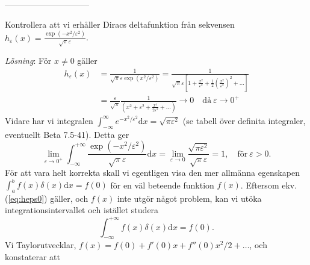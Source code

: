 \documentclass[%
oneside,                 %
final,                   %
10pt]{article}
\newenvironment{notice_mdfboxadmon}[1][]{
\begin{notice_mdfboxmdframed}[frametitle=#1]
}
{
\end{notice_mdfboxmdframed}
}
\begin{document}
------------------------------


\begin{notice_mdfboxadmon}

Kontrollera att vi erhåller Diracs deltafunktion från sekvensen $h_\varepsilon(x) = \frac{\exp(-x^2 / \varepsilon^2)}{\sqrt{\pi} \varepsilon}$.

\emph{Lösning}:
För $x \neq 0$ gäller
\begin{align}
h_\varepsilon(x) 
&= \frac{1}{\sqrt{\pi} \varepsilon \exp(x^2 / \varepsilon^2)}
= \frac{1}{\sqrt{\pi} \varepsilon \left[ 1 + \frac{x^2}{\varepsilon^2} + \frac{1}{2}\left(\frac{x^2}{\varepsilon^2}\right)^2 + \ldots \right] } \nonumber \\ 
&= \frac{\varepsilon}{\sqrt{\pi}} \frac{1}{\left( x^2 + \varepsilon^2 + \frac{x^4}{2\varepsilon^2} + \ldots \right)} \to 0 \quad \mathrm{då~} \varepsilon \to 0^+
\label{eq:heps0}
\end{align}
Vidare har vi integralen $\int_{-\infty}^\infty e^{-x^2 / \varepsilon^2} \mbox{d}x = \sqrt{\pi \varepsilon^2}$ (se tabell över definita integraler, eventuellt Beta 7.5-41). Detta ger
\begin{equation}
\lim_{\varepsilon \to 0^+}
\int_{-\infty}^{+\infty} \frac{\exp(-x^2 / \varepsilon^2)}{\sqrt{\pi} \varepsilon} \mbox{d}x = \lim_{\varepsilon \to 0} \frac{\sqrt{\pi \varepsilon^2}}{\sqrt{\pi} \varepsilon} = 1, \quad \mathrm{för~} \varepsilon>0.
\label{eq:heps1}
\end{equation}
För att vara helt korrekta skall vi egentligen visa den mer allmänna egenskapen $\int_a^b f(x) \delta(x) \mbox{d}x = f(0)$ för en väl beteende funktion $f(x)$. Eftersom ekv. (\ref{eq:heps0}) gäller, och $f(x)$ inte utgör något problem, kan vi utöka integrationsintervallet och istället studera
\begin{equation}
\int_{-\infty}^{+\infty} f(x) \delta(x) \mbox{d}x = f(0).
\end{equation}
Vi Taylorutvecklar, $f(x) = f(0) + f'(0)x + f''(0)x^2/2+\ldots$, och konstaterar att 


\end{notice_mdfboxadmon}
\end{document}
